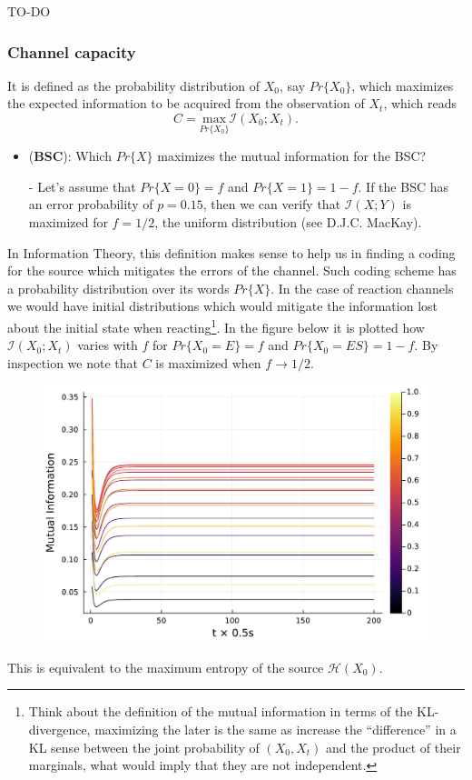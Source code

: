 \documentclass[11pt]{amsart}
\begin{document}
TO-DO

\subsubsection{Channel capacity}
It is defined as the probability distribution of $X_0$, say $Pr\{X_0\}$, which maximizes the expected information to be acquired from the observation of $X_t$, which reads
$$C = \underset{Pr\{X_0\}}{\text{max}} \mathcal{I}(X_0;X_t).$$

\begin{itemize}
\item ({\bf BSC}): Which $Pr\{X\}$ maximizes the mutual information for the BSC?
\item[-] Let's assume that $Pr\{X = 0\} = f$ and $Pr\{X = 1\} = 1-f$. If the BSC has an error probability of $p=0.15$, then we can verify that $\mathcal{I}(X;Y)$ is maximized for $f=1/2$, the uniform distribution (see D.J.C. MacKay).

\end{itemize}


In Information Theory, this definition makes sense to help us in finding a coding for the source which mitigates the errors of the channel. Such coding scheme has a probability distribution over its words $Pr\{X\}$. In the case of reaction channels we would have initial distributions which would mitigate the information lost about the initial state when reacting\footnote{Think about the definition of the mutual information in terms of the KL-divergence, maximizing the later is the same as increase the ``difference'' in a KL sense between the joint probability of $(X_0,X_t)$ and the product of their marginals, what would imply that they are not independent.}. In the figure below it is plotted how $\mathcal{I}(X_0;X_t)$ varies with $f$ for $Pr\{X_0 = E\} = f$ and $Pr\{X_0 = ES\} = 1-f$. By inspection we note that $C$ is maximized when $f \rightarrow 1/2$.

\begin{figure}[h]
\includegraphics[scale=.5]{I_mutual}
\end{figure}

This is equivalent to the maximum entropy of the source $\mathcal{H}(X_0)$.
\end{document}
